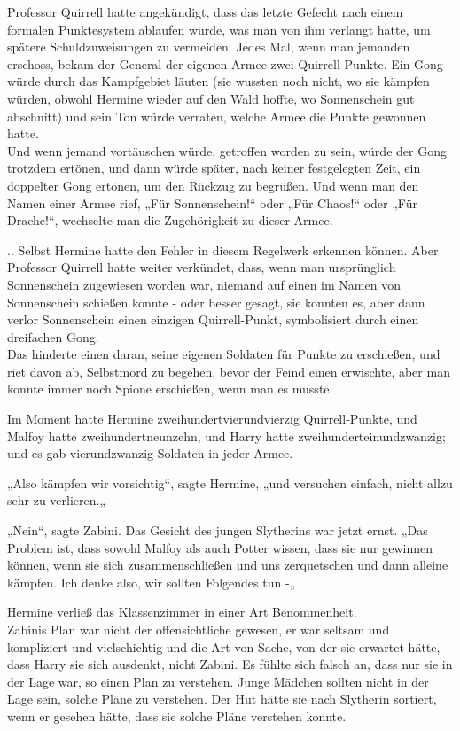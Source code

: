{Professor Quirrell hatte angekündigt, dass das letzte Gefecht nach einem formalen Punktesystem ablaufen würde, was man von ihm verlangt hatte, um spätere Schuldzuweisungen zu vermeiden. Jedes Mal, wenn man jemanden erschoss, bekam der General der eigenen Armee zwei Quirrell-Punkte. Ein Gong würde durch das Kampfgebiet läuten (sie wussten noch nicht, wo sie kämpfen würden, obwohl Hermine wieder auf den Wald hoffte, wo Sonnenschein gut abschnitt) und sein Ton würde verraten, welche Armee die Punkte gewonnen hatte.\\ Und wenn jemand vortäuschen würde, getroffen worden zu sein, würde der Gong trotzdem ertönen, und dann würde später, nach keiner festgelegten Zeit, ein doppelter Gong ertönen, um den Rückzug zu begrüßen. Und wenn man den Namen einer Armee rief, „Für Sonnenschein!“ oder „Für Chaos!“ oder „Für Drache!“, wechselte man die Zugehörigkeit zu dieser Armee.

.. Selbst Hermine hatte den Fehler in diesem Regelwerk erkennen können. Aber Professor Quirrell hatte weiter verkündet, dass, wenn man ursprünglich Sonnenschein zugewiesen worden war, niemand auf einen im Namen von Sonnenschein schießen konnte - oder besser gesagt, sie konnten es, aber dann verlor Sonnenschein einen einzigen Quirrell-Punkt, symbolisiert durch einen dreifachen Gong.\\ Das hinderte einen daran, seine eigenen Soldaten für Punkte zu erschießen, und riet davon ab, Selbstmord zu begehen, bevor der Feind einen erwischte, aber man konnte immer noch Spione erschießen, wenn man es musste.

Im Moment hatte Hermine zweihundertvierundvierzig Quirrell-Punkte, und Malfoy hatte zweihundertneunzehn, und Harry hatte zweihunderteinundzwanzig; und es gab vierundzwanzig Soldaten in jeder Armee.

„Also kämpfen wir vorsichtig“, sagte Hermine, „und versuchen einfach, nicht allzu sehr zu verlieren.„

„Nein“, sagte Zabini. Das Gesicht des jungen Slytherins war jetzt ernst. „Das Problem ist, dass sowohl Malfoy als auch Potter wissen, dass sie nur gewinnen können, wenn sie sich zusammenschließen und uns zerquetschen und dann alleine kämpfen. Ich denke also, wir sollten Folgendes tun -„

Hermine verließ das Klassenzimmer in einer Art Benommenheit.\\ Zabinis Plan war nicht der offensichtliche gewesen, er war seltsam und kompliziert und vielschichtig und die Art von Sache, von der sie erwartet hätte, dass Harry sie sich ausdenkt, nicht Zabini. Es fühlte sich falsch an, dass nur sie in der Lage war, so einen Plan zu verstehen. Junge Mädchen sollten nicht in der Lage sein, solche Pläne zu verstehen. Der Hut hätte sie nach Slytherin sortiert, wenn er gesehen hätte, dass sie solche Pläne verstehen konnte.

}
